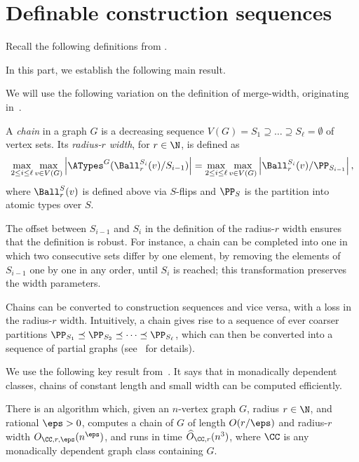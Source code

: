 

\part{Definable construction sequences}\label{part:definable-construction-sequences}

Recall the following definitions from .


In this part, we establish the following main result.
\thmskeldefseq*

We will use the following variation on the definition of merge-width, originating in~\cite{drabik2026variants}.

\begin{definition}\label{def:chain-width}
  A \emph{chain} in a graph $G$ is a decreasing sequence $V(G)=S_1\supseteq\dots\supseteq S_\ell=\emptyset$ of vertex sets. Its \emph{radius-$r$ width}, for $r\in\N$, is defined as
$$\max_{2\le i\le \ell} \max_{v\in V(G)}\left|\ATypes^G(\Ball_r^{S_{i}}(v)/S_{i-1})\right|=\max_{2\le i\le \ell} \max_{v\in V(G)}\left|\Ball_r^{S_{i}}(v)/\PP_{S_{i-1}}\right|,$$
where $\Ball_r^S(v)$ is defined above via $S$-flips and $\PP_{S}$ is the partition into atomic types over $S$.
\end{definition}


The offset between $S_{i-1}$ and $S_i$ in the definition of the radius-$r$ width ensures that the definition is robust. For instance, a chain can be completed into one in which two consecutive sets differ by one element,
by removing the elements of $S_{i-1}$ one by one in any order, until $S_i$ is reached; this transformation
preserves the width parameters.

Chains can be converted to construction sequences and vice versa, with a loss in the radius-$r$ width.
Intuitively, a chain
gives rise to a sequence of ever coarser partitions $\PP_{S_1}\preceq \PP_{S_2}\preceq\dots \preceq \PP_{S_\ell}$, which can then be converted
into a sequence of partial graphs
(see~\cite{drabik2026variants} for details).

We use the following key result from~\cite{md-abmw}. It says that in monadically dependent classes, chains of constant length and small width can be computed efficiently.

\begin{theorem}\label{thm:monadic-dependence-implies-definable-mw}
  There is an algorithm which, given
  an $n$-vertex graph $G$, radius $r\in\N$, and rational $\eps>0$, computes a chain of $G$ of length $O(r/\eps)$ and radius-$r$ width $O_{\CC,r,\eps}(n^\eps)$,
  and runs in time  $\widehat O_{\CC,r}(n^{3})$,
  where $\CC$ is any monadically dependent graph class containing $G$.
\end{theorem}

